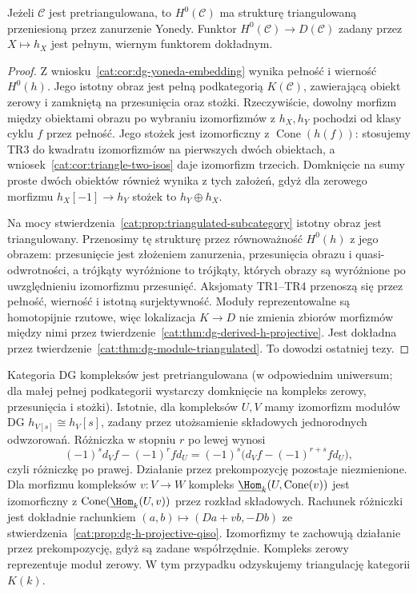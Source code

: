 \begin{twierdzenie}\label{cat:thm:dg-pretriangulated-h0}
Jeżeli $\mathcal C$ jest pretriangulowana, to $H^0(\mathcal C)$ ma strukturę triangulowaną przeniesioną przez zanurzenie Yonedy. Funktor $H^0(\mathcal C)\to D(\mathcal C)$ zadany przez $X\mapsto h_X$ jest pełnym, wiernym funktorem dokładnym.
\end{twierdzenie}
\begin{proof}
Z wniosku~\ref{cat:cor:dg-yoneda-embedding} wynika pełność i wierność $H^0(h)$. Jego istotny obraz jest pełną podkategorią $K(\mathcal C)$, zawierającą obiekt zerowy i zamkniętą na przesunięcia oraz stożki. Rzeczywiście, dowolny morfizm między obiektami obrazu po wybraniu izomorfizmów z $h_X,h_Y$ pochodzi od klasy cyklu $f$ przez pełność. Jego stożek jest izomorficzny z $\operatorname{Cone}(h(f))$: stosujemy TR3 do kwadratu izomorfizmów na pierwszych dwóch obiektach, a wniosek~\ref{cat:cor:triangle-two-isos} daje izomorfizm trzecich. Domknięcie na sumy proste dwóch obiektów również wynika z tych założeń, gdyż dla zerowego morfizmu $h_X[-1]\to h_Y$ stożek to $h_Y\oplus h_X$.

Na mocy stwierdzenia~\ref{cat:prop:triangulated-subcategory} istotny obraz jest triangulowany. Przenosimy tę strukturę przez równoważność $H^0(h)$ z jego obrazem: przesunięcie jest złożeniem zanurzenia, przesunięcia obrazu i quasi-odwrotności, a trójkąty wyróżnione to trójkąty, których obrazy są wyróżnione po uwzględnieniu izomorfizmu przesunięć. Aksjomaty TR1--TR4 przenoszą się przez pełność, wierność i istotną surjektywność. Moduły reprezentowalne są homotopijnie rzutowe, więc lokalizacja $K\to D$ nie zmienia zbiorów morfizmów między nimi przez twierdzenie~\ref{cat:thm:dg-derived-h-projective}. Jest dokładna przez twierdzenie~\ref{cat:thm:dg-module-triangulated}. To dowodzi ostatniej tezy.
\end{proof}

\begin{przyklad}\label{cat:ex:dg-complexes-pretriangulated}
Kategoria DG kompleksów jest pretriangulowana (w odpowiednim uniwersum; dla małej pełnej podkategorii wystarczy domknięcie na kompleks zerowy, przesunięcia i stożki). Istotnie, dla kompleksów $U,V$ mamy izomorfizm modułów DG $h_{V[s]}\cong h_V[s]$, zadany przez utożsamienie składowych jednorodnych odwzorowań. Różniczka w stopniu $r$ po lewej wynosi
\[
 (-1)^s d_V f-(-1)^r f d_U
 =(-1)^s\bigl(d_Vf-(-1)^{r+s}fd_U\bigr),
\]
czyli różniczkę po prawej. Działanie przez prekompozycję pozostaje niezmienione. Dla morfizmu kompleksów $v:V\to W$ kompleks
$\underline{\Hom}_k(U,\operatorname{Cone}(v))$ jest izomorficzny z $\operatorname{Cone}(\underline{\Hom}_k(U,v))$ przez rozkład składowych. Rachunek różniczki jest dokładnie rachunkiem $(a,b)\mapsto(Da+vb,-Db)$ ze stwierdzenia~\ref{cat:prop:dg-h-projective-qiso}. Izomorfizmy te zachowują działanie przez prekompozycję, gdyż są zadane współrzędnie. Kompleks zerowy reprezentuje moduł zerowy. W tym przypadku odzyskujemy triangulację kategorii $K(k)$.
\end{przyklad}

